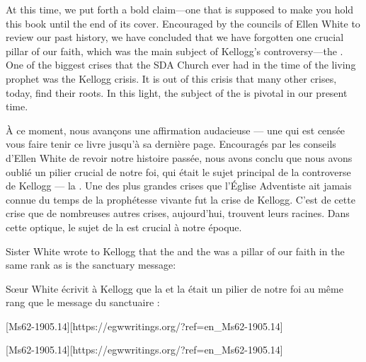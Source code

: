 At this time, we put forth a bold claim—one that is supposed to make you hold this book until the end of its cover. Encouraged by the councils of Ellen White to review our past history, we have concluded that we have forgotten one crucial pillar of our faith, which was the main subject of Kellogg’s controversy—the . One of the biggest crises that the SDA Church ever had in the time of the living prophet was the Kellogg crisis. It is out of this crisis that many other crises, today, find their roots. In this light, the subject of the  is pivotal in our present time.


À ce moment, nous avançons une affirmation audacieuse — une qui est censée vous faire tenir ce livre jusqu'à sa dernière page. Encouragés par les conseils d'Ellen White de revoir notre histoire passée, nous avons conclu que nous avons oublié un pilier crucial de notre foi, qui était le sujet principal de la controverse de Kellogg — la . Une des plus grandes crises que l'Église Adventiste ait jamais connue du temps de la prophétesse vivante fut la crise de Kellogg. C'est de cette crise que de nombreuses autres crises, aujourd'hui, trouvent leurs racines. Dans cette optique, le sujet de la  est crucial à notre époque.


Sister White wrote to Kellogg that the  and the  was a pillar of our faith in the same rank as is the sanctuary message:


Sœur White écrivit à Kellogg que la  et la  était un pilier de notre foi au même rang que le message du sanctuaire :


[Ms62-1905.14][https://egwwritings.org/?ref=en\_Ms62-1905.14]


[Ms62-1905.14][https://egwwritings.org/?ref=en\_Ms62-1905.14]


